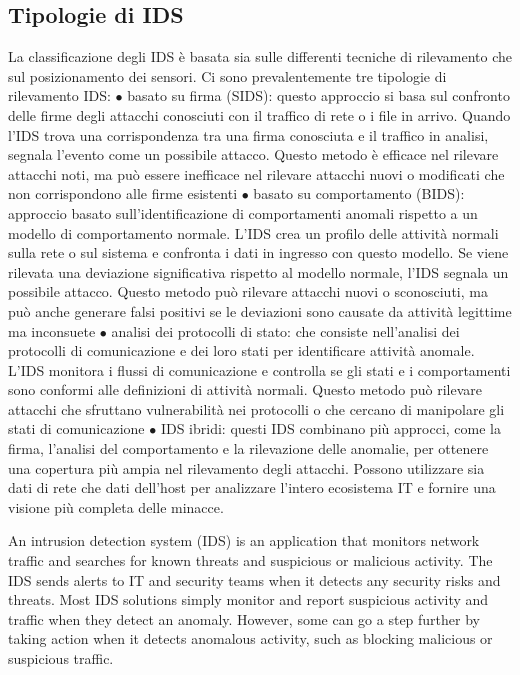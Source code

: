 \subsection{Tipologie di IDS}
La classificazione degli IDS è basata sia sulle differenti tecniche di rilevamento che sul posizionamento dei sensori.
Ci sono prevalentemente tre tipologie di rilevamento IDS:
$\bullet$ basato su firma (SIDS): questo approccio si basa sul confronto delle firme degli attacchi conosciuti con 
il traffico di rete o i file in arrivo. 
Quando l’IDS trova una corrispondenza tra una firma conosciuta e il traffico in analisi, 
segnala l’evento come un possibile attacco. Questo metodo è efficace nel rilevare attacchi noti, 
ma può essere inefficace nel rilevare attacchi nuovi o modificati che non corrispondono alle firme esistenti
$\bullet$ basato su comportamento (BIDS): approccio basato sull’identificazione di comportamenti 
anomali rispetto a un modello di comportamento normale. 
L’IDS crea un profilo delle attività normali sulla rete o sul sistema e confronta 
i dati in ingresso con questo modello. 
Se viene rilevata una deviazione significativa rispetto al modello normale, l’IDS segnala un possibile attacco. 
Questo metodo può rilevare attacchi nuovi o sconosciuti, ma può anche generare falsi positivi se le deviazioni sono causate da attività legittime ma inconsuete
$\bullet$ analisi dei protocolli di stato: che consiste nell’analisi dei protocolli di 
comunicazione e dei loro stati per identificare attività anomale. 
L’IDS monitora i flussi di comunicazione e controlla se gli stati e i comportamenti sono 
conformi alle definizioni di attività normali. 
Questo metodo può rilevare attacchi che sfruttano vulnerabilità nei protocolli o che cercano di manipolare gli stati di comunicazione
$\bullet$ IDS ibridi: questi IDS combinano più approcci, come la firma, l’analisi del comportamento e 
la rilevazione delle anomalie, per ottenere una copertura più ampia nel rilevamento degli attacchi. 
Possono utilizzare sia dati di rete che dati dell’host per analizzare l’intero ecosistema IT e 
fornire una visione più completa delle minacce.


An intrusion detection system (IDS) is an application that monitors network traffic and 
searches for known threats and suspicious or malicious activity. 
The IDS sends alerts to IT and security teams when it detects any security risks and threats.
Most IDS solutions simply monitor and report suspicious activity and traffic when they detect an anomaly. 
However, some can go a step further by taking action when it detects anomalous activity, 
such as blocking malicious or suspicious traffic.

